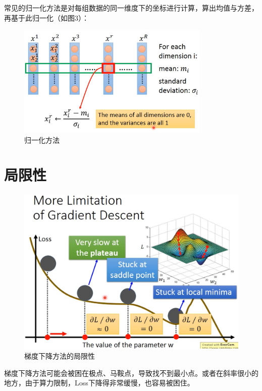 \documentclass[UTF8,a4paper]{ctexart}
\begin{document}
常见的归一化方法是对每组数据的同一维度下的坐标进行计算，算出均值与方差，再基于此归一化（如图3）：

\begin{figure}[ht]
\centering
\includegraphics[width=260pt]{scalingMethod.png}
\caption{归一化方法}
\end{figure}

\newpage

\section{局限性}

\begin{figure}[ht]
\centering
\includegraphics[width=340pt]{limitation.png}
\caption{梯度下降方法的局限性}
\end{figure}

梯度下降方法可能会被困在极点、马鞍点，导致找不到最小点。或者在斜率很小的地方，由于算力限制，Loss下降得非常缓慢，也容易被困住。
\end{document}
